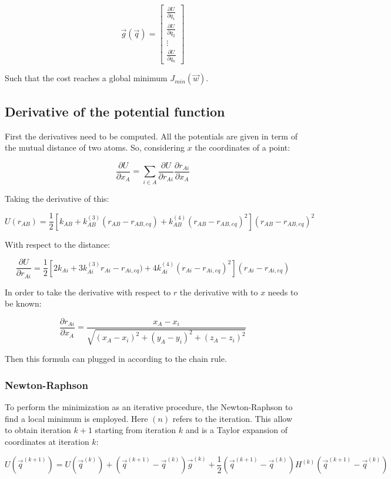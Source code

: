 	$$\vec{g}(\vec{q}) = \begin{bmatrix} \frac{\partial U}{\partial q_1} \\ \frac{\partial U}{\partial q_2} \\ \vdots \\ \frac{\partial U}{\partial q_n}\end{bmatrix}$$

	Such that the cost reaches a global minimum $J_{min}(\vec{w})$.

	\subsection{Derivative of the potential function}
	First the derivatives need to be computed.
	All the potentials are given in term of the mutual distance of two atoms.
	So, considering $x$ the coordinates of a point:

	$$\frac{\partial U}{\partial x_A} = \sum\limits_{i\in A}\frac{\partial U}{\partial r_{Ai}}\frac{\partial r_{Ai}}{\partial x_A}$$

	Taking the derivative of this:

	$$U(r_{AB}) = \frac{1}{2}[k_{AB}+k_{AB}^{(3)}(r_{AB}-r_{AB, eq}) + k_{AB}^{(4)}(r_{AB}-r_{AB, eq})^2](r_{AB}-r_{AB,eq})^2$$

	With respect to the distance:

	$$\frac{\partial U}{\partial r_{Ai}} = \frac{1}{2}[2k_{Ai}+3k_{Ai}^{(3)}r_{Ai}-r_{Ai, eq}) + 4k^{(4)}_{Ai}(r_{Ai}-r_{Ai, eq})^2](r_{Ai}-r_{Ai, eq})$$

	In order to take the derivative with respect to $r$ the derivative with to $x$ needs to be known:

	$$\frac{\partial r_{Ai}}{\partial x_A} = \frac{x_A-x_i}{\sqrt{(x_A-x_i)^2+(y_A-y_i)^2+(z_A-z_i)^2}}$$

	Then this formula can plugged in according to the chain rule.

		\subsubsection{Newton-Raphson}
		To perform the minimization as an iterative procedure, the Newton-Raphson to find a local minimum is employed.
		Here $(n)$ refers to the iteration.
		This allow to obtain iteration $k+1$ starting from iteration $k$ and is a Taylor expansion of coordinates at iteration $k$:

		$$U(\vec{q}^{(k+1)}) = U(\vec{q}^{(k)}) + (\vec{q}^{(k+1)} -\vec{q}^{(k)})\vec{g}^{(k)} + \frac{1}{2}(\vec{q}^{(k+1)}-\vec{q}^{(k)})H^{(k)}(\vec{q}^{(k+1)}-\vec{q}^{(k)})$$

